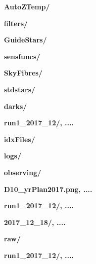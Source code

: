 \documentclass[12pt]{article}
\begin{document}
\hspace{15mm} \textbf{AutoZTemp/} 
\vspace{1mm}

\hspace{15mm} \textbf{filters/} 
\vspace{1mm}

\hspace{15mm} \textbf{GuideStars/}
\vspace{1mm}

\hspace{15mm} \textbf{sensfuncs/}
\vspace{1mm}

\hspace{15mm} \textbf{SkyFibres/}
\vspace{1mm}

\hspace{15mm} \textbf{stdstars/}
\vspace{1mm}

\hspace{10mm} \textbf{darks/} 
\vspace{1mm}

\hspace{15mm} \textbf{run1\_2017\_12/, ....}
\vspace{1mm}

\hspace{10mm} \textbf{idxFiles/} 
\vspace{1mm}

\hspace{10mm} \textbf{logs/} 
\vspace{1mm}

\hspace{10mm} \textbf{observing/} 
\vspace{1mm}

\hspace{15mm} \textbf{D10\_yrPlan2017.png, ....} 
\vspace{1mm}

\hspace{15mm} \textbf{run1\_2017\_12/, ....} 
\vspace{1mm}

\hspace{20mm} \textbf{2017\_12\_18/, ....}
\vspace{1mm}

\hspace{10mm} \textbf{raw/} 
\vspace{1mm}

\hspace{15mm} \textbf{run1\_2017\_12/, ....} 
\vspace{1mm}
\end{document}
